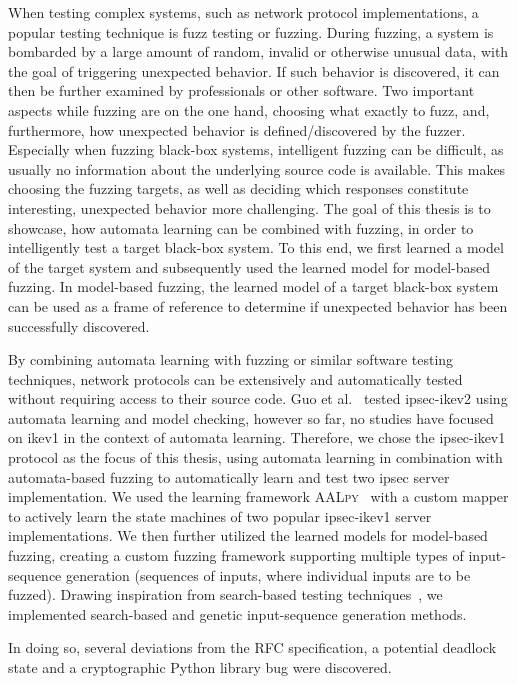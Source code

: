 When testing complex systems, such as network protocol implementations, a popular testing technique is fuzz testing or fuzzing. During fuzzing, a system is bombarded by a large amount of random, invalid or otherwise unusual data, with the goal of triggering unexpected behavior. If such behavior is discovered, it can then be further examined by professionals or other software. Two important aspects while fuzzing are on the one hand, choosing what exactly to fuzz, and, furthermore, how unexpected behavior is defined/discovered by the fuzzer. Especially when fuzzing black-box systems, intelligent fuzzing can be difficult, as usually no information about the underlying source code is available. This makes choosing the fuzzing targets, as well as deciding which responses constitute interesting, unexpected behavior more challenging. The goal of this thesis is to showcase, how automata learning can be combined with fuzzing, in order to intelligently test a target black-box system. To this end, we first learned a model of the target system and subsequently used the learned model for model-based fuzzing. In model-based fuzzing, the learned model of a target black-box system can be used as a frame of reference to determine if unexpected behavior has been successfully discovered. 

By combining automata learning with fuzzing or similar software testing techniques, network protocols can be extensively and automatically tested without requiring access to their source code. Guo et al.~\cite{guo2019model} tested \ac{ipsec}-\ac{ike}v2 using automata learning and model checking, however so far, no studies have focused on \ac{ike}v1 in the context of automata learning. Therefore, we chose the \ac{ipsec}-\ac{ike}v1 protocol as the focus of this thesis, using automata learning in combination with automata-based fuzzing to automatically learn and test two \ac{ipsec} server implementation. We used the learning framework \textsc{AALpy}~\cite{software:aalpy} with a custom mapper to actively learn the state machines of two popular \ac{ipsec}-\ac{ike}v1 server implementations. We then further utilized the learned models for model-based fuzzing, creating a custom fuzzing framework supporting multiple types of input-sequence generation (sequences of inputs, where individual inputs are to be fuzzed). Drawing inspiration from search-based testing techniques~\cite{fuzzingbook2023:SearchBasedFuzzer}, we implemented search-based and genetic input-sequence generation methods. 

In doing so, several deviations from the RFC specification, a potential deadlock state and a cryptographic Python library bug were discovered.


